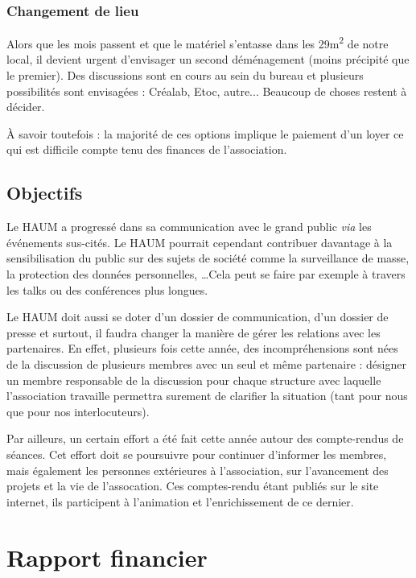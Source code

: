 \documentclass[a4paper, 11pt]{article}
\begin{document}
\subsubsection{Changement de lieu}

Alors que les mois passent et que le matériel s'entasse dans les 29m\textsuperscript{2} de notre local, il devient
urgent d'envisager un second déménagement (moins précipité que le premier). Des discussions sont en cours au sein du bureau et plusieurs
possibilités sont envisagées : Créalab, Etoc, autre... Beaucoup de choses restent à décider.

À savoir toutefois : la majorité de ces options implique le paiement d'un loyer ce qui est difficile compte tenu des
finances de l'association.

\subsection{Objectifs}

Le HAUM a progressé dans sa communication avec le grand public \textit{via} les événements sus-cités. Le HAUM pourrait cependant contribuer davantage à la sensibilisation du public sur
des sujets de société comme la surveillance de masse, la protection des données personnelles, \ldots Cela peut se faire
par exemple à travers les talks ou des conférences plus longues.

\medskip

Le HAUM doit aussi se doter d'un dossier de communication, d'un dossier de presse et surtout, il faudra changer la manière de gérer les relations avec les partenaires.
En effet, plusieurs fois cette année, des incompréhensions sont nées de la discussion de plusieurs membres avec un seul
et même partenaire : désigner un membre responsable de la discussion pour chaque structure avec laquelle l'association
travaille permettra surement de clarifier la situation (tant pour nous que pour nos interlocuteurs).

Par ailleurs, un certain effort a été fait cette année autour des compte-rendus de séances. Cet effort doit se
poursuivre pour continuer d'informer les membres, mais également les personnes extérieures à l'association, sur
l'avancement des projets et la vie de l'assocation. Ces comptes-rendu étant publiés sur le site internet, ils
participent à l'animation et l'enrichissement de ce dernier.

\section{Rapport financier}
\end{document}
